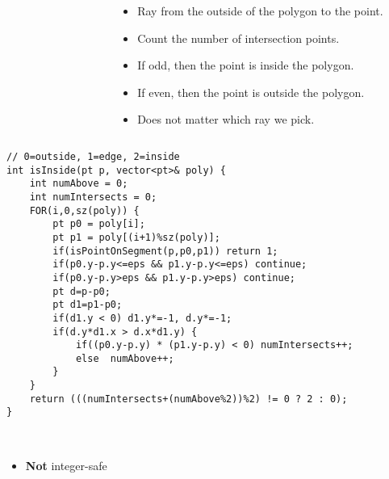 \documentclass[12pt,t]{beamer}
\newcommand{\bi}{\begin{itemize}}
\newcommand{\ei}{\end{itemize}}
\begin{document}
\begin{frame}
\begin{columns}
\begin{column}{0.6\textwidth}
\begin{figure}
      \end{figure}
    \end{column}
    \begin{column}{0.5\textwidth}
      \bi
        \item Ray from the outside of the polygon to the point.
        \item Count the number of intersection points.
        \item If odd, then the point is inside the polygon.
        \item If even, then the point is outside the polygon.
        \item Does not matter which ray we pick.
      \ei
    \end{column}
  \end{columns}
\end{frame}

\begin{frame}[fragile]
  \vspace{20pt}
  \begin{verbatim}
// 0=outside, 1=edge, 2=inside
int isInside(pt p, vector<pt>& poly) {
    int numAbove = 0;
    int numIntersects = 0;
    FOR(i,0,sz(poly)) {
        pt p0 = poly[i];
        pt p1 = poly[(i+1)%sz(poly)];
        if(isPointOnSegment(p,p0,p1)) return 1;
        if(p0.y-p.y<=eps && p1.y-p.y<=eps) continue;
        if(p0.y-p.y>eps && p1.y-p.y>eps) continue;
        pt d=p-p0;
        pt d1=p1-p0;
        if(d1.y < 0) d1.y*=-1, d.y*=-1;
        if(d.y*d1.x > d.x*d1.y) {
            if((p0.y-p.y) * (p1.y-p.y) < 0) numIntersects++;
            else  numAbove++;
        }
    }
    return (((numIntersects+(numAbove%2))%2) != 0 ? 2 : 0);
}
  \end{verbatim}
  \ \\
  \bi
  	\item \textbf{Not} integer-safe
  \ei
\end{frame}
\end{document}
